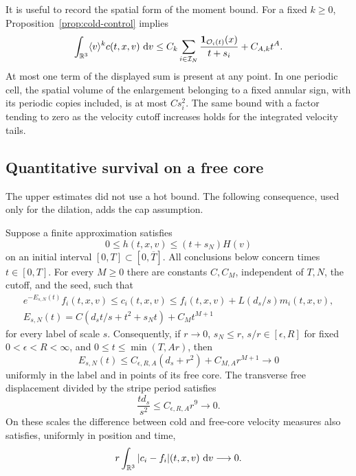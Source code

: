 It is useful to record the spatial form of the moment bound.
For a fixed \(k\ge0\), Proposition~\ref{prop:cold-control} implies
\begin{equation}
 \int_{\mathbb R^3}\langle v\rangle^k c(t,x,v)\,\,\mathrm d v
 \le C_k\sum_{i\in\mathcal I_N}
       \frac{\mathbf 1_{\mathcal O_i(t)}(x)}{t+s_i}
       +C_{A,k}t^A.
 \label{jet:spatial-moment-envelope}
\end{equation}
At most one term of the displayed sum is present at any point.
In one periodic cell, the spatial volume of the enlargement
belonging to a fixed annular sign, with its periodic copies
included, is at most \(Cs_i^2\).
The same bound with a factor tending to zero as the velocity
cutoff increases holds for the integrated velocity tails.

\subsection{Quantitative survival on a free core}

The upper estimates did not use a hot bound.  The following
consequence, used only for the dilation, adds the cap assumption.

\begin{corollary}
\label{jet:survival}
Suppose a finite approximation satisfies
\[
 0\le h(t,x,v)\le(t+s_N)H(v)
\]
on an initial interval \([0,T]\subset[0,\overline T]\).
All conclusions below concern times \(t\in[0,T]\).
For every \(M\ge0\) there are constants \(C,C_M\), independent of
\(T,N\), the cutoff, and the seed, such that
\begin{equation}
\begin{gathered}
 e^{-E_{s,N}(t)}f_i(t,x,v)
       \le c_i(t,x,v)
       \le f_i(t,x,v)+L(d_s/s)m_i(t,x,v),\\
 E_{s,N}(t)=C(d_st/s+t^2+s_Nt)+C_Mt^{M+1}
\end{gathered}
 \label{jet:survival-sandwich}
\end{equation}
for every label of scale \(s\).
Consequently, if \(r\to0\), \(s_N\le r\), \(s/r\in[\epsilon,R]\)
for fixed \(0<\epsilon<R<\infty\), and \(0\le t\le\min(T,Ar)\), then
\[
 E_{s,N}(t)\le
 C_{\epsilon,R,A}(d_s+r^2)+C_{M,A}r^{M+1}\longrightarrow0
\]
uniformly in the label and in points of its free core.
The transverse free displacement divided by the stripe period
satisfies
\begin{equation}
 \frac{td_s}{s^2}\le
       C_{\epsilon,R,A}r^9\longrightarrow0.
 \label{jet:stripe-displacement}
\end{equation}
On these scales the difference between cold and free-core
velocity measures also satisfies, uniformly in position and time,
\begin{equation}
 r\int_{\mathbb R^3}|c_i-f_i|(t,x,v)\,\,\mathrm d v\longrightarrow0.
 \label{jet:survival-measure}
\end{equation}
\end{corollary}

